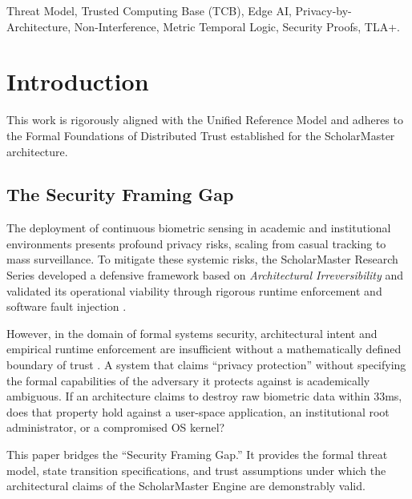 \documentclass[conference]{IEEEtran}
\begin{document}
\begin{IEEEkeywords}
Threat Model, Trusted Computing Base (TCB), Edge AI, Privacy-by-Architecture, Non-Interference, Metric Temporal Logic, Security Proofs, TLA+.
\end{IEEEkeywords}

\section{Introduction} This work is rigorously aligned with the Unified Reference Model \cite{P20} and adheres to the Formal Foundations of Distributed Trust \cite{P21} established for the ScholarMaster architecture.

\subsection{The Security Framing Gap}
The deployment of continuous biometric sensing in academic and institutional environments presents profound privacy risks, scaling from casual tracking to mass surveillance. To mitigate these systemic risks, the ScholarMaster Research Series developed a defensive framework based on \textit{Architectural Irreversibility} \cite{P17} and validated its operational viability through rigorous runtime enforcement and software fault injection \cite{P18}. 

However, in the domain of formal systems security, architectural intent and empirical runtime enforcement are insufficient without a mathematically defined boundary of trust \cite{b1}. A system that claims ``privacy protection'' without specifying the formal capabilities of the adversary it protects against is academically ambiguous. If an architecture claims to destroy raw biometric data within $33$ms, does that property hold against a user-space application, an institutional root administrator, or a compromised OS kernel? 

This paper bridges the ``Security Framing Gap.'' It provides the formal threat model, state transition specifications, and trust assumptions under which the architectural claims of the ScholarMaster Engine are demonstrably valid.
\end{document}
